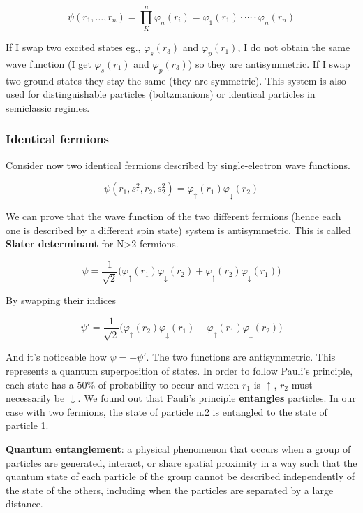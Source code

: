 		$$\psi(r_1, \dots, r_n)= \prod_K^n\varphi_n(r_i)=\varphi_1(r_1)\cdot \cdots\cdot \varphi_n(r_n)$$

		If I swap two excited states eg., $\varphi_s(r_3)$ and $\varphi_p(r_1)$, I do not obtain the same wave function (I get $\varphi_s(r_1)$ and $\varphi_p(r_3)$) so they are antisymmetric.
		If I swap two ground states they stay the same (they are symmetric).
		This system is also used for distinguishable particles (boltzmanions) or identical particles in semiclassic regimes.

		\subsubsection{Identical fermions}
		Consider now two identical fermions described by single-electron wave functions.

		$$\psi(r_1, s_1^2, r_2, s_2^2)=\varphi_{\uparrow}(r_1)\varphi_{\downarrow}(r_2)$$

		We can prove that the wave function of the two different fermions (hence each one is described by a different spin state) system is antisymmetric.
		This is called \textbf{Slater determinant} for N>2 fermions.

		$$\psi=\frac{1}{\sqrt{2}}\big(\varphi_{\uparrow}(r_1)\varphi_{\downarrow}(r_2)+\varphi_{\uparrow}(r_2)\varphi_{\downarrow}(r_1)\big)$$

		By swapping their indices

		$$\psi'=\frac{1}{\sqrt{2}}\big(\varphi_{\uparrow}(r_2)\varphi_{\downarrow}(r_1)-\varphi_{\uparrow}(r_1)\varphi_{\downarrow}(r_2)\big)$$

		And it's noticeable how $\psi = -\psi'$.
		The two functions are antisymmetric.
		This represents a quantum superposition of states.
		In order to follow Pauli's principle, each state has a $50\%$ of probability to occur and when $r_1$ is $\uparrow$,  $r_2$ must necessarily be $\downarrow$.
		We found out that Pauli's principle \textbf{entangles} particles.
		In our case with two fermions, the state of particle n.2 is entangled to the state of particle 1.

		\begin{center}
		\textbf{Quantum entanglement}: a physical phenomenon that occurs when a group of particles are generated, interact, or share spatial proximity in a way such that the quantum state of each particle of the group cannot be described independently of the state of the others, including when the particles are separated by a large distance.
		\end{center}


